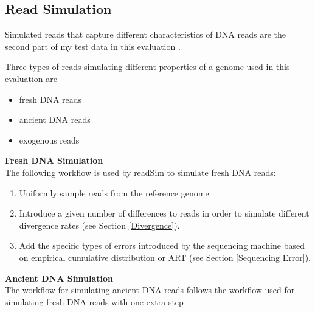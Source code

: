 \documentclass[11pt,a4paper]{report}
\begin{document}



\subsection{Read Simulation} \label{Read Simulation}

Simulated reads that capture different characteristics
of DNA reads are the second part of my test data in this
evaluation .

Three types of reads simulating different properties of
a genome used in this evaluation are

\begin{itemize}
	\item fresh DNA reads
	\item ancient DNA reads
	\item exogenous reads
\end{itemize}

\textbf{Fresh DNA Simulation}\\

The following workflow is used by readSim to simulate fresh DNA
 reads:

\begin{enumerate}
 \item Uniformly sample reads from the reference genome.

 \item Introduce a given number of differences to 
 reads in order to simulate different divergence rates
 (see Section \ref{Divergence}).

 \item Add the specific types of errors introduced by the sequencing 
 machine based on empirical cumulative distribution or ART\cite{art} 
 (see Section \ref{Sequencing Error}).
\end{enumerate}


\textbf{Ancient DNA Simulation} \\

The workflow for simulating ancient DNA reads follows the
 workflow used for simulating fresh DNA reads with one extra step
\end{document}

